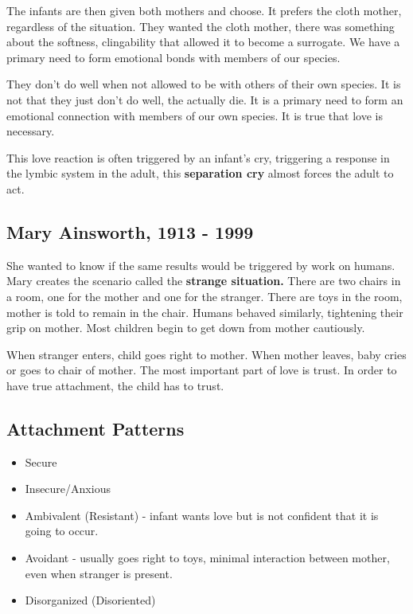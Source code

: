 \documentclass[12pt]{article}
\begin{document}
The infants are then given both mothers and choose. It prefers the cloth mother, regardless of the situation. They wanted the cloth mother, there was something about the softness, clingability that allowed it to become a surrogate. We have a primary need to form emotional bonds with members of our species. 

They don't do well when not allowed to be with others of their own species. It is not that they just don't do well, the actually die. It is a primary need to form an emotional connection with members of our own species. It is true that love is necessary. 

This love reaction is often triggered by an infant's cry, triggering a response in the lymbic system in the adult, this \textbf{separation cry} almost forces the adult to act.

\subsection*{Mary Ainsworth, 1913 - 1999}
She wanted to know if the same results would be triggered by work on humans. Mary creates the scenario called the \textbf{strange situation.} There are two chairs in a room, one for the mother and one for the stranger. There are toys in the room, mother is told to remain in the chair. Humans behaved similarly, tightening their grip on mother. Most children begin to get down from mother cautiously. 

 When stranger enters, child goes right to mother. When mother leaves, baby cries or goes to chair of mother. The most important part of love is trust. In order to have true attachment, the child has to trust. 

\subsection*{Attachment Patterns}
\begin{itemize}
\item Secure
\item Insecure/Anxious
\item Ambivalent (Resistant) - infant wants love but is not confident that it is going to occur. 
\item Avoidant - usually goes right to toys, minimal interaction between mother, even when stranger is present.
\item Disorganized (Disoriented) 

\end{itemize}
\end{document}
